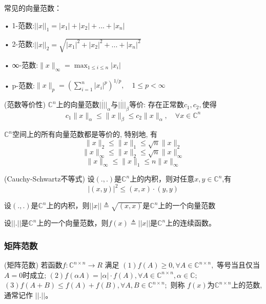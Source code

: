 \documentclass[12pt,a4paper]{article}
\begin{document}
常见的向量范数：

• 1-范数:$||x||_1=|x_1|+|x_2|+...+|x_n|$

• 2-范数:$||x||_2=\sqrt{|x_1|^2+|x_2|^2+...+|x_n|^2}$

• ∞-范数:$\|x\|_{\infty}=\max _{1 \leq i \leq n}\left|x_{i}\right|$

• p-范数:$\|x\|_{p}=\left(\sum_{i=1}^{n}\left|x_{i}\right|^{p}\right)^{1 / p}, \quad 1 \leq p<\infty$


\begin{definition}(范数等价性)
	$\mathbb{C}^{n}$上的向量范数$||\dot||_{\alpha}$与$||\dot||_{\beta}$等价: 存在正常数$c_1, c_2,$使得
	$$c_{1}\|x\|_{\alpha} \leq\|x\|_{\beta} \leq c_{2}\|x\|_{\alpha}, \quad \forall x \in \mathbb{C}^{n}$$
\end{definition}



\begin{theorem}
	$\mathbb{C}^{n}$空间上的所有向量范数都是等价的, 特别地, 有
	$$
	\|x\|_{2} \leq\|x\|_{1} \leq \sqrt{n}\|x\|_{2}
	$$
	$$
	\|x\|_{\infty} \leq\|x\|_{2} \leq \sqrt{n}\|x\|_{\infty}
	$$
	$$
	\|x\|_{\infty} \leq\|x\|_{1} \leq n\|x\|_{\infty}
	$$
\end{theorem}



\begin{theorem}(Cauchy-Schwartz不等式)
	设$(.,.)$是$\mathbb{C}^{n}$上的内积，则对任意$x,y \in \mathbb{C}^{n}$,有
	$$
	|(x, y)|^{2} \leq(x, x) \cdot(y, y)
	$$
\end{theorem}



\begin{corollary}
	设$(.,.)$是$\mathbb{C}^{n}$上的内积，则$||x||\triangleq \sqrt{(x,x)}$是$\mathbb{C}^{n}$上的一个向量范数
\end{corollary}



\begin{theorem}
	设$||.||$是$\mathbb{C}^{n}$上的一个向量范数，则$f(x)\triangleq||x||$是$\mathbb{C}^{n}$上的连续函数。
\end{theorem}


\subsubsection{矩阵范数}

\begin{definition}(矩阵范数)
	若函数$f : \mathbb{C}^{n×n} → R$ 满足
	$(1) f(A) ≥ 0, ∀ A ∈ \mathbb{C}^{n×n},$ 等号当且仅当 $A = 0$时成立;
	$(2) f(αA) = |α| · f(A), ∀ A ∈ \mathbb{C}^{n×n}, α ∈ \mathbb{C};$
	$(3) f(A + B) ≤ f(A) + f(B), ∀A, B ∈ \mathbb{C}^{n×n};$
	则称 $f(x) $为$\mathbb{C}
	^{n×n} $上的范数, 通常记作 $||.||$。
\end{definition}
\end{document}
